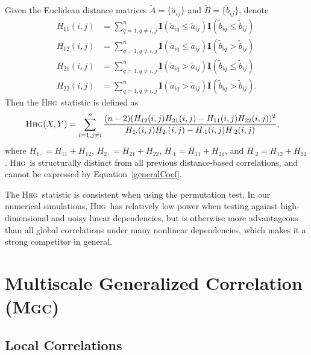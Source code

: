 \documentclass[11pt]{article}
\providecommand{\sct}[1]{{\normalfont\textsc{#1}}}
\providecommand{\mb}[1]{\boldsymbol{#1}}
\newcommand{\Mgc}{\sct{Mgc}}
\newcommand{\Hhg}{\sct{Hhg}}
\begin{document}
Given the Euclidean distance matrices $\tilde{A}=\{\tilde{a}_{ij}\}$ and $\tilde{B}=\{\tilde{b}_{ij}\}$, denote
\begin{align*}
H_{11}(i,j) &= \sum_{q=1,q\neq i,j}^{n}\mb{I}(\tilde{a}_{iq} \leq \tilde{a}_{ij})\mb{I}(\tilde{b}_{iq} \leq \tilde{b}_{ij}) \\
H_{12}(i,j) &= \sum_{q=1,q\neq i,j}^{n}\mb{I}(\tilde{a}_{iq} \leq \tilde{a}_{ij})\mb{I}(\tilde{b}_{iq} > \tilde{b}_{ij}) \\
H_{21}(i,j) &= \sum_{q=1,q\neq i,j}^{n}\mb{I}(\tilde{a}_{iq} > \tilde{a}_{ij})\mb{I}(\tilde{b}_{iq} \leq \tilde{b}_{ij}) \\
H_{22}(i,j) &= \sum_{q=1,q\neq i,j}^{n}\mb{I}(\tilde{a}_{iq} > \tilde{a}_{ij})\mb{I}(\tilde{b}_{iq} > \tilde{b}_{ij}).
\end{align*}
Then the \Hhg~statistic is defined as
\begin{align*}
\Hhg(X,Y) &= \sum_{i=1,j\neq i}^{n} \frac{(n-2)(H_{12}(i,j)H_{21}(i,j)-H_{11}(i,j)H_{22}(i,j))^2}{H_{1 \cdot}(i,j)H_{2 \cdot}(i,j)-H_{\cdot 1}(i,j)H_{\cdot 2}(i,j)},
\end{align*}
where $H_{1 \cdot}=H_{11}+H_{12}$, $H_{2 \cdot}=H_{21}+H_{22}$, $H_{\cdot 1}=H_{11}+H_{21}$, and $H_{\cdot 2}=H_{12}+H_{22}$. \Hhg~is structurally distinct from all previous distance-based correlations, and cannot be expressed by Equation~\ref{generalCoef}.

The \Hhg~statistic is consistent when using the permutation test. In our numerical simulations, \Hhg~has relatively low power when testing against high-dimensional and noisy linear dependencies, but is otherwise more advantageous than all global correlations under many nonlinear dependencies, which makes it a strong competitor in general. 

\section{Multiscale Generalized Correlation (\Mgc)}
\label{appen:mgc}

\subsection{Local Correlations}
\label{appen:localCorr}
\end{document}
